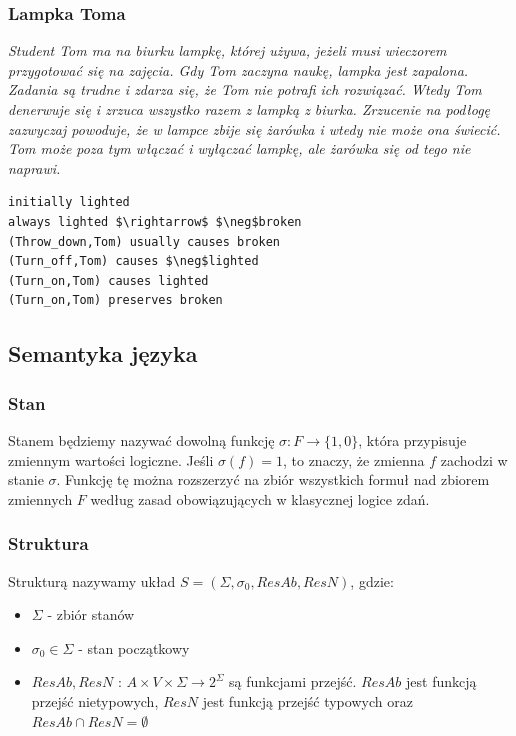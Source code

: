 \documentclass{article}
\begin{document}
\subsubsection{Lampka Toma}

\textit{
    Student Tom ma na biurku lampkę, której używa, jeżeli musi wieczorem przygotować się na zajęcia. 
    Gdy Tom zaczyna naukę, lampka jest zapalona.
    Zadania są trudne i zdarza się, że Tom nie potrafi ich rozwiązać. Wtedy Tom denerwuje się i zrzuca wszystko razem z lampką z biurka. Zrzucenie na podłogę zazwyczaj powoduje, że w lampce zbije się żarówka i wtedy nie może ona świecić.
    Tom może poza tym włączać i wyłączać lampkę, ale żarówka się od tego nie naprawi.
}

\bigskip
{}
\begin{lstlisting}[mathescape=true]
initially lighted
always lighted $\rightarrow$ $\neg$broken
(Throw_down,Tom) usually causes broken
(Turn_off,Tom) causes $\neg$lighted
(Turn_on,Tom) causes lighted
(Turn_on,Tom) preserves broken
\end{lstlisting}


\subsection{Semantyka języka} 

\subsubsection{Stan}
Stanem będziemy nazywać dowolną funkcję $\sigma:F\to \{1,0\}$, która przypisuje zmiennym wartości logiczne. Jeśli $\sigma(f)=1$, to znaczy, że zmienna $f$ zachodzi w stanie $\sigma$. Funkcję tę można rozszerzyć na zbiór wszystkich formuł nad zbiorem zmiennych $F$ według zasad obowiązujących w klasycznej logice zdań.

\subsubsection{Struktura}
Strukturą nazywamy układ $S=(\Sigma, \sigma_{0}, ResAb, ResN)$, gdzie:
\begin{itemize}
\item $\Sigma$ - zbiór stanów
\item $\sigma_{0} \in \Sigma$ - stan początkowy
\item $ResAb, ResN$ : $A\times V \times \Sigma \to 2^{\Sigma}$ są funkcjami przejść. $ResAb$ jest funkcją przejść nietypowych, $ResN$ jest funkcją przejść typowych oraz $ResAb \cap ResN= \emptyset$ 
\end{itemize}
\end{document}
